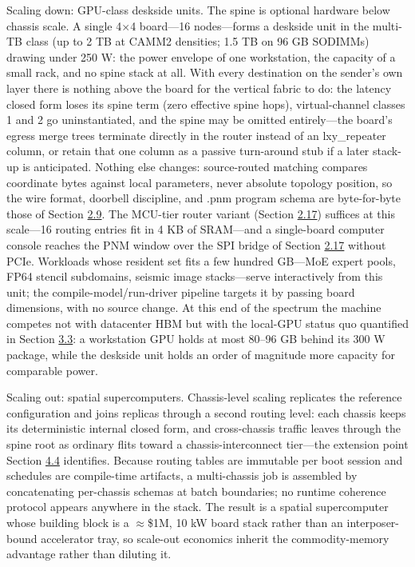 \documentclass[12pt,onecolumn]{article}
\begin{document}
Scaling down: GPU-class deskside units. The spine is optional hardware below chassis scale. A single 4$\times$4 board---16 nodes---forms a deskside unit in the multi-TB class (up to 2 TB at CAMM2 densities; 1.5 TB on 96 GB SODIMMs) drawing under 250 W: the power envelope of one workstation, the capacity of a small rack, and no spine stack at all. With every destination on the sender's own layer there is nothing above the board for the vertical fabric to do: the latency closed form loses its spine term (zero effective spine hops), virtual-channel classes 1 and 2 go uninstantiated, and the spine may be omitted entirely---the board's egress merge trees terminate directly in the router instead of an lxy\_repeater column, or retain that one column as a passive turn-around stub if a later stack-up is anticipated. Nothing else changes: source-routed matching compares coordinate bytes against local parameters, never absolute topology position, so the wire format, doorbell discipline, and .pnm program schema are byte-for-byte those of Section \hyperref[sec:2.9]{2.9}. The MCU-tier router variant (Section \hyperref[sec:2.17]{2.17}) suffices at this scale---16 routing entries fit in 4 KB of SRAM---and a single-board computer console reaches the PNM window over the SPI bridge of Section \hyperref[sec:2.17]{2.17} without PCIe. Workloads whose resident set fits a few hundred GB---MoE expert pools, FP64 stencil subdomains, seismic image stacks---serve interactively from this unit; the compile-model/run-driver pipeline targets it by passing board dimensions, with no source change. At this end of the spectrum the machine competes not with datacenter HBM but with the local-GPU status quo quantified in Section \hyperref[sec:3.3]{3.3}: a workstation GPU holds at most 80--96 GB behind its 300 W package, while the deskside unit holds an order of magnitude more capacity for comparable power.

Scaling out: spatial supercomputers. Chassis-level scaling replicates the reference configuration and joins replicas through a second routing level: each chassis keeps its deterministic internal closed form, and cross-chassis traffic leaves through the spine root as ordinary flits toward a chassis-interconnect tier---the extension point Section \hyperref[sec:4.4]{4.4} identifies. Because routing tables are immutable per boot session and schedules are compile-time artifacts, a multi-chassis job is assembled by concatenating per-chassis schemas at batch boundaries; no runtime coherence protocol appears anywhere in the stack. The result is a spatial supercomputer whose building block is a $\approx$\$1M, 10 kW board stack rather than an interposer-bound accelerator tray, so scale-out economics inherit the commodity-memory advantage rather than diluting it.
\end{document}
